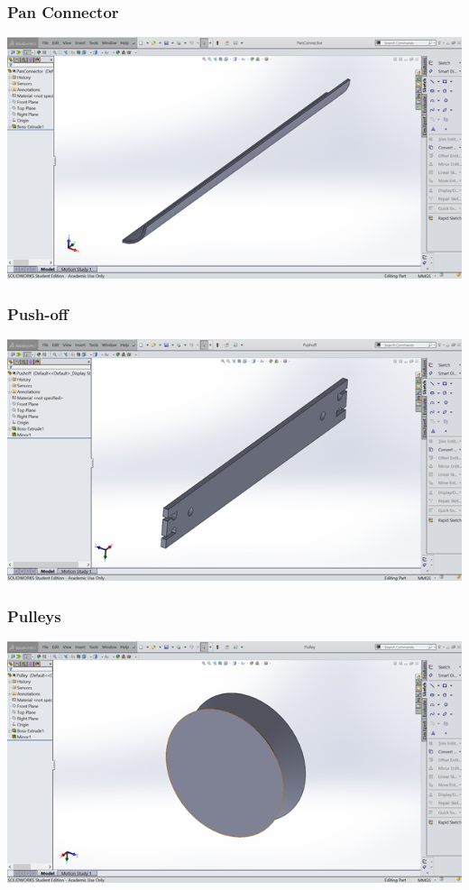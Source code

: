 \documentclass[12pt]{article}
\begin{document}
\subsubsection{Pan Connector}
\includegraphics{pan-connector}
\subsubsection{Push-off}
\includegraphics{pushoff}
\subsubsection{Pulleys}
\includegraphics{pulleys}
\end{document}

